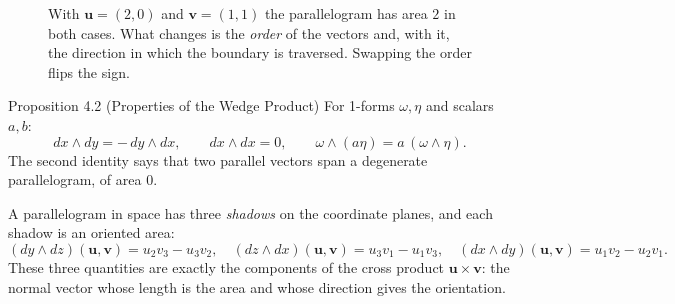 \documentclass[11pt,letterpaper]{article}
\newcommand{\manualsubsection}[1]{%
  \Needspace{5\baselineskip}%
  \par\vspace{0.2cm}\noindent{\bfseries\color{orangeacc} #1}\par\nobreak
  \vspace{0.12cm}
}
\begin{document}
\begin{figure}[htbp]
\centering
{}
\caption{With $\mathbf{u}=(2,0)$ and $\mathbf{v}=(1,1)$ the parallelogram has
area $2$ in both cases. What changes is the \emph{order} of the vectors and,
with it, the direction in which the boundary is traversed. Swapping the order
flips the sign.}
\label{fig:area-orientada}
\end{figure}
\FloatBarrier

\begin{theorembox}{Proposition 4.2 (Properties of the Wedge Product)}
For 1-forms $\omega,\eta$ and scalars $a,b$:
\begin{equation}
  dx\wedge dy=-\,dy\wedge dx,\qquad
  dx\wedge dx=0,\qquad
  \omega\wedge(a\eta)=a\,(\omega\wedge\eta).
\end{equation}
The second identity says that two parallel vectors span a degenerate
parallelogram, of area $0$.
\end{theorembox}

\manualsubsection{In $\mathbb{R}^3$: Three Planes, Three Areas}
A parallelogram in space has three \emph{shadows} on the coordinate planes,
and each shadow is an oriented area:
\begin{equation}
  (dy\wedge dz)(\mathbf{u},\mathbf{v})=u_2v_3-u_3v_2,\quad
  (dz\wedge dx)(\mathbf{u},\mathbf{v})=u_3v_1-u_1v_3,\quad
  (dx\wedge dy)(\mathbf{u},\mathbf{v})=u_1v_2-u_2v_1 .
\end{equation}
These three quantities are exactly the components of the cross product
$\mathbf{u}\times\mathbf{v}$: the normal vector whose length is the area and
whose direction gives the orientation.
\end{document}
